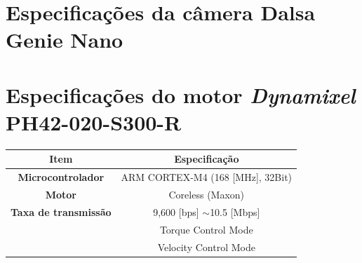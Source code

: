 \documentclass[
12pt,					%
openright,				%
twoside,				%
a4paper,				%
english,
brazil
]{ABNT/abntex2_report}
\begin{document}
	\anexos
	\justify
	\chapter{Especificações da câmera Dalsa Genie Nano}
	\label{ann:relant}
	
	

	\chapter{Especificações do motor \textit{Dynamixel} PH42-020-S300-R}
	\label{ann:esp_motors_hp42}

	\begin{table}[H]
		\begin{adjustbox}{max width=\textwidth}
		\begin{tabular}{|c|c|}
		\hline
		\rowcolor[HTML]{EFEFEF} 
		\textbf{Item}                                                                               & \textbf{Especificação}                                                                          \\ \hline
		\rowcolor[HTML]{FFFFFF} 
		{\color[HTML]{000000} \textbf{Microcontrolador}}                                            & {\color[HTML]{000000} ARM CORTEX-M4 (168 {[}MHz{]}, 32Bit)}                                     \\ \hline
		\rowcolor[HTML]{EFEFEF} 
		{\color[HTML]{000000} \textbf{Motor}}                                                       & {\color[HTML]{000000} Coreless (Maxon)}                                                         \\ \hline
		\rowcolor[HTML]{FFFFFF} 
		{\color[HTML]{000000} \textbf{Taxa de transmissão}}                                         & {\color[HTML]{000000} 9,600 {[}bps{]} $\sim$10.5 {[}Mbps{]}}                                    \\ \hline
		\rowcolor[HTML]{EFEFEF} 
		\cellcolor[HTML]{EFEFEF}{\color[HTML]{000000} }                                             & {\color[HTML]{000000} Torque Control Mode}                                                      \\ \cline{2-2} 
		\rowcolor[HTML]{EFEFEF} 
		\cellcolor[HTML]{EFEFEF}{\color[HTML]{000000} }                                             & {\color[HTML]{000000} Velocity Control Mode}                                                    \\ \cline{2-2} 

\end{tabular}
\end{adjustbox}
\end{table}
\end{document}
